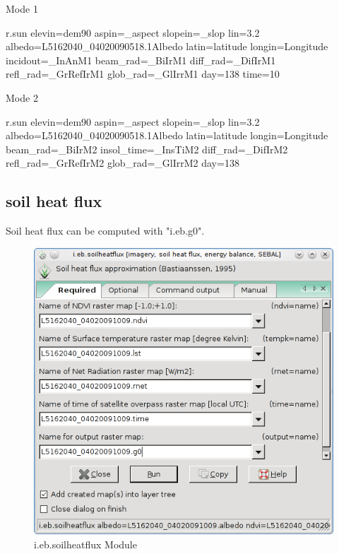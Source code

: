 Mode 1
\begin{smallverbatim}
 r.sun elevin=dem90
  aspin=_aspect slopein=_slop lin=3.2
  albedo=L5162040_04020090518.1Albedo
  latin=latitude longin=Longitude
  incidout=_InAnM1 beam_rad=_BiIrM1
  diff_rad=_DifIrM1 refl_rad=_GrRefIrM1
  glob_rad=_GlIrrM1 day=138 time=10
\end{smallverbatim}

Mode 2
\begin{smallverbatim}
 r.sun elevin=dem90
  aspin=_aspect slopein=_slop lin=3.2
  albedo=L5162040_04020090518.1Albedo
  latin=latitude longin=Longitude
  beam_rad=_BiIrM2 insol_time=_InsTiM2
  diff_rad=_DifIrM2 refl_rad=_GrRefIrM2
  glob_rad=_GlIrrM2 day=138
\end{smallverbatim}


\subsection{soil heat flux}
Soil heat flux can be computed with "i.eb.g0".\newline

\begin{figure}[htbp]
   \centering
   \includegraphics[scale=0.4]{gipe026.png}
   \caption{i.eb.soilheatflux Module}
   \label{fig:gipe026}
\end{figure}

